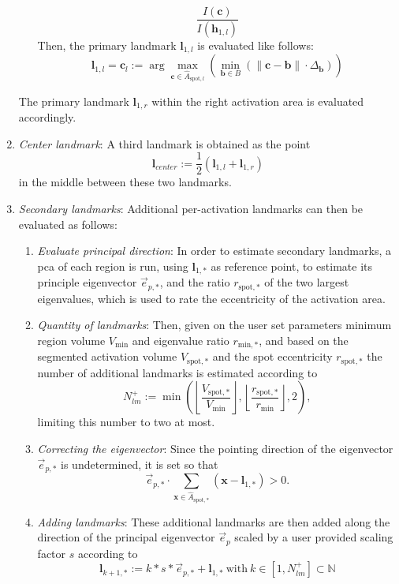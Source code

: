 \documentclass{frontiers}
\newcommand{\vect}[1]{\ensuremath{\mathbf{#1}}}
\newcommand{\vx}{\vect{x}}
\newcommand{\lm}[1]{\ensuremath{\mathbf{l}_{#1}}}
\newcommand{\emitem}[1]{\item \emph{#1}}
\newcommand{\pc}{\ensuremath{\mathbf{c}}}
\newcommand{\pb}{\ensuremath{\mathbf{b}}}
\newcommand{\hp}[1]{\ensuremath{\mathbf{h}_{#1}}}
\begin{document}
\begin{myalgorithm}
\begin{enumerate}
\begin{enumerate}
\begin{equation}
                   \frac{I(\pc)}{I(\hp{1,l})}
  \end{equation}
  \noindent 
  Then, the primary landmark \lm{1,l} is evaluated like follows: 
  \begin{equation}
    \lm{1,l} = \pc_{l} := \arg \max_{ \pc\in\hat{A}_{\text{spot},l}}\left( \min_{\pb \in B}\left(\|\pc-\pb\| \cdot  \Delta_\pb \right)\right)
  \end{equation}
  \end{enumerate}
  \noindent 
  The primary landmark \lm{1,r} within the right activation area is evaluated accordingly. 
  \emitem{Center landmark}: A third  landmark is obtained as the point 
  \begin{equation}
  \label{eq:middle}
  \lm{center} := \frac{1}{2}\left(\lm{1,l} + \lm{1,r}\right)
  \end{equation}
  in the middle between these two landmarks.
  \emitem{Secondary landmarks}: Additional per-activation landmarks can then be evaluated as follows: 
  \begin{enumerate}
  \emitem{Evaluate principal direction}:
  In order to estimate secondary landmarks, a \gls*{pca} of each region is run, using \lm{1,*} as reference point, 
    to estimate its principle eigenvector $\vec{e}_{p,*}$, and the ratio $r_{\text{spot},*}$ of the two largest 
    eigenvalues, which is used to rate the eccentricity of the activation area. 
  \emitem{Quantity of landmarks}:
  Then, given on the user set parameters minimum region volume $V_{\text{min}}$ and eigenvalue ratio $r_{\text{min},*}$, 
    and based on the segmented activation volume $V_{\text{spot},*}$  and the spot eccentricity $r_{\text{spot},*}$
    the number of additional landmarks is estimated according to
  \begin{equation}
  \label{eq:nlm}
    N^+_{lm} := \min\left(  \left\lfloor \frac{ V_{\text{spot},*}}{V_{\text{min}}}\right\rfloor,
                   \left\lfloor \frac{ r_{\text{spot},*}}{r_{\text{min}}} \right\rfloor, 2\right), 
  \end{equation}
  \noindent 
  limiting this number to two at most. 
  \emitem{Correcting the eigenvector}: Since the pointing direction of the eigenvector $\vec{e}_{p,*}$ is undetermined,
    it is set so that 
  \begin{equation}
      \vec{e}_{p,*} \cdot \sum_{\vx \in \hat{A}_{\text{spot},*}}(\vx - \lm{1,*}) > 0. 
  \end{equation}
  \emitem{Adding landmarks}: 
  These additional landmarks are then added along the direction of the principal eigenvector $\vec{e}_p$ scaled by a user 
    provided scaling factor $s$ according to 
  \begin{equation}
  \label{eq:addlm}
  \lm{k+1,*} := k * s * \vec{e}_{p,*} + \lm{1,*} \: \text{with} \: k\in[1, N^+_{lm}]\subset \mathbb{N}
  \end{equation}
  \end{enumerate}
  \end{enumerate}
\end{myalgorithm}
\end{document}

